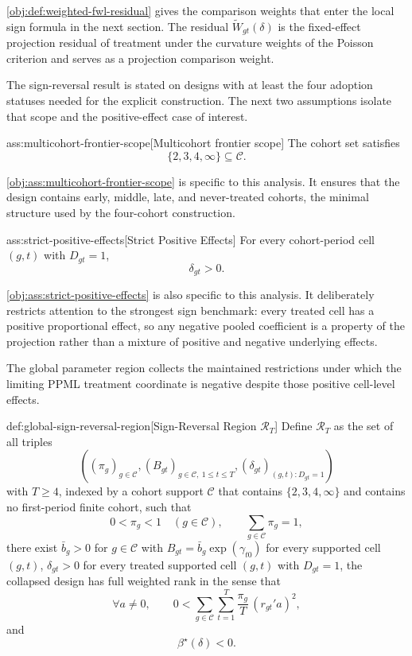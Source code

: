 \documentclass[11pt]{article}
\begin{document}
\cref{obj:def:weighted-fwl-residual} gives the comparison weights that enter the local sign formula in the next section. The residual \(\widetilde W_{gt}(\delta)\) is the fixed-effect projection residual of treatment under the curvature weights of the Poisson criterion and serves as a projection comparison weight.

The sign-reversal result is stated on designs with at least the four adoption statuses needed for the explicit construction. The next two assumptions isolate that scope and the positive-effect case of interest.

\begin{assumptionv}{ass:multicohort-frontier-scope}[Multicohort frontier scope]
The cohort set satisfies
\[
\{2,3,4,\infty\}\subseteq \mathcal C.
\]
\end{assumptionv}

\cref{obj:ass:multicohort-frontier-scope} is specific to this analysis. It ensures that the design contains early, middle, late, and never-treated cohorts, the minimal structure used by the four-cohort construction.

\begin{assumptionv}{ass:strict-positive-effects}[Strict Positive Effects]
For every cohort-period cell \((g,t)\) with \(D_{gt}=1\),
\[
\delta_{gt}>0.
\]
\end{assumptionv}

\cref{obj:ass:strict-positive-effects} is also specific to this analysis. It deliberately restricts attention to the strongest sign benchmark: every treated cell has a positive proportional effect, so any negative pooled coefficient is a property of the projection rather than a mixture of positive and negative underlying effects.

The global parameter region collects the maintained restrictions under which the limiting PPML treatment coordinate is negative despite those positive cell-level effects.

\begin{definitionv}{def:global-sign-reversal-region}[Sign-Reversal Region \(\mathcal R_T\)]
Define \(\mathcal R_T\) as the set of all triples
\[
\left((\pi_g)_{g\in\mathcal C},(B_{gt})_{g\in\mathcal C,\ 1\le t\le T},(\delta_{gt})_{(g,t):D_{gt}=1}\right)
\]
with \(T\ge 4\), indexed by a cohort support \(\mathcal C\) that contains \(\{2,3,4,\infty\}\) and contains no first-period finite cohort, such that
\[
0<\pi_g<1\quad(g\in\mathcal C),\qquad \sum_{g\in\mathcal C}\pi_g=1,
\]
there exist \(\bar b_g>0\) for \(g\in\mathcal C\) with \(B_{gt}=\bar b_g\exp(\gamma_{t0})\) for every supported cell \((g,t)\), \(\delta_{gt}>0\) for every treated supported cell \((g,t)\) with \(D_{gt}=1\), the collapsed design has full weighted rank in the sense that
\[
\forall a\ne 0,\qquad
0<\sum_{g\in\mathcal C}\sum_{t=1}^T \frac{\pi_g}{T}\,(r_{gt}'a)^2,
\]
and
\[
\beta^\star(\delta)<0.
\]
\end{definitionv}
\end{document}
